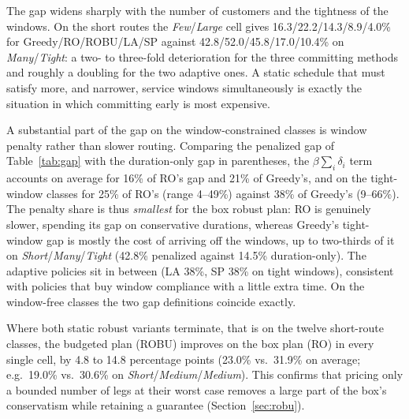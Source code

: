 The gap widens sharply with the number of customers and the tightness of the
windows.  On the short routes the \emph{Few}/\emph{Large} cell gives
16.3/22.2/14.3/8.9/4.0\% for Greedy/RO/ROBU/LA/SP against
42.8/52.0/45.8/17.0/10.4\% on \emph{Many}/\emph{Tight}: a two- to three-fold
deterioration for the three committing methods and roughly a doubling for the
two adaptive ones.  A static schedule that must satisfy more, and narrower,
service windows simultaneously is exactly the situation in which committing
early is most expensive.

A substantial part of the gap on the window-constrained classes is window
penalty rather than slower routing.  Comparing the penalized gap of
Table~\ref{tab:gap} with the duration-only gap in parentheses,
the $\beta\sum_i\delta_i$ term accounts on average for 16\% of RO's gap and
21\% of Greedy's, and on the tight-window classes for 25\% of RO's (range
4--49\%) against 38\% of Greedy's (9--66\%).  The penalty share is thus
\emph{smallest} for the box robust plan: RO is genuinely slower, spending its
gap on conservative durations, whereas Greedy's tight-window gap is mostly the
cost of arriving off the windows, up to two-thirds of it on
\emph{Short}/\emph{Many}/\emph{Tight} (42.8\% penalized against 14.5\%
duration-only).  The adaptive policies sit in between (LA 38\%, SP 38\% on
tight windows), consistent with policies that buy window compliance with a
little extra time.  On the window-free classes the two gap definitions coincide
exactly.

Where both static robust variants terminate, that is on the twelve short-route
classes, the budgeted plan (ROBU) improves on the box plan (RO) in every single
cell, by 4.8 to 14.8 percentage points (23.0\% vs.\ 31.9\% on average; e.g.\
19.0\% vs.\ 30.6\% on \emph{Short}/\emph{Medium}/\emph{Medium}).  This confirms
that pricing only a bounded number of legs at their worst case removes a large
part of the box's conservatism while retaining a guarantee
(Section~\ref{sec:robu}).

